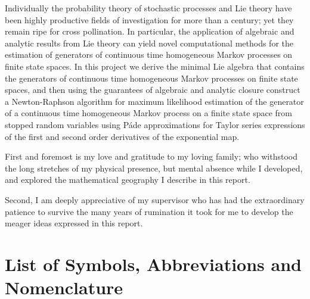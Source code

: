 \documentclass[12pt]{ucalgthes1}
\theoremstyle{definition}\newtheorem{definition}{Definition}
\begin{document}
	\newpage
	Individually the probability theory of stochastic processes and Lie theory 
	have been highly productive fields of investigation for more than a century; 
	yet they remain ripe for cross pollination. In particular, the application of 
	algebraic and analytic results from Lie theory can yield novel computational 
	methods for the estimation of generators of continuous time homogeneous Markov 
	processes on finite state spaces. In this project we derive the minimal Lie 
	algebra that contains the generators of continuous time homogeneous Markov 
	processes on finite state spaces, and then using the guarantees of algebraic 
	and analytic closure construct a Newton-Raphson algorithm for maximum 
	likelihood estimation of the generator of a continuous time homogeneous Markov 
	process on a finite state space from stopped random variables using P\'ade 
	approximations for Taylor series expressions of the first and second order 
	derivatives of the exponential map.

	\newpage
	First and foremost is my love and gratitude to my loving family; who 
	withstood the long stretches of my physical presence, but mental absence while 
	I developed, and explored the mathematical geography I describe in this 
	report.
	
	Second, I am deeply appreciative of my supervisor who has had the 
	extraordinary patience to survive the many years of rumination it took for me 
	to develop the meager ideas expressed in this report.

	\begin{singlespace}
		\newpage
		\tableofcontents
		\pagestyle{plain}
		\newpage
		\listoftables
		\pagestyle{plain}
		\newpage
		\listoffigures
		\pagestyle{plain}
		\clearpage
		\clearpage
	\end{singlespace}
	\newpage
	\chapter*{\bf{List of Symbols, Abbreviations and Nomenclature}\hfill} 
	\listofsymbols
	\pagestyle{plain}
	\clearpage

	
	
	
	
	
	 
	
	\appendix
	
\end{document}

